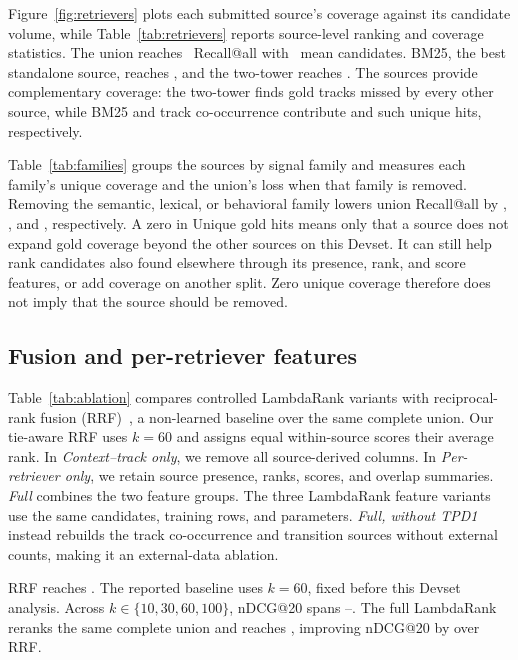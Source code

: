 \documentclass[sigconf]{acmart}
\begin{document}
Figure~\ref{fig:retrievers} plots each submitted source's coverage against its
candidate volume, while Table~\ref{tab:retrievers} reports source-level ranking
and coverage statistics.  The union reaches \DevUnionRecallAll\ Recall@all with
\DevUnionMeanCandidates\ mean candidates.  BM25, the best standalone source,
reaches \DevBMRecallAll, and the two-tower reaches \DevTwoTowerRecallAll.  The
sources provide complementary coverage:
the two-tower finds \DevTwoTowerUniqueHits{} gold tracks missed by every other
source, while BM25 and track co-occurrence contribute \DevBMUniqueHits{} and
\DevTrackCoocUniqueHits{} such unique hits, respectively.

Table~\ref{tab:families} groups the sources by signal family and measures each
family's unique coverage and the union's loss when that family is removed.
Removing the semantic, lexical, or behavioral family lowers union Recall@all by
\DevSemanticAblation, \DevLexicalAblation, and \DevBehavioralAblation,
respectively.
A zero in Unique gold hits means only that a source does not expand gold coverage
beyond the other sources on this Devset.  It can still help rank candidates
also found elsewhere through its presence, rank, and score features, or add
coverage on another split.  Zero unique coverage therefore does not imply that
the source should be removed.

\subsection{Fusion and per-retriever features}
Table~\ref{tab:ablation} compares controlled LambdaRank variants with
reciprocal-rank fusion (RRF)~\cite{cormack2009rrf}, a non-learned baseline over
the same complete union.  Our tie-aware RRF uses $k=60$ and assigns equal
within-source scores their average rank.  In \emph{Context--track only}, we
remove all source-derived columns.  In
\emph{Per-retriever only}, we retain source presence, ranks, scores, and overlap
summaries.  \emph{Full} combines the two feature groups.  The three LambdaRank
feature variants use the same candidates, training rows, and parameters.
\emph{Full, without TPD1} instead rebuilds the track co-occurrence and
transition sources without external counts, making it an external-data
ablation.

RRF reaches \DevRRFTwenty.  The reported baseline uses $k=60$, fixed before
this Devset analysis.  Across $k\in\{10,30,60,100\}$, nDCG@20 spans
\DevRRFMinTwenty--\DevRRFMaxTwenty.
The full LambdaRank reranks the same complete union and reaches
\DevFullTwenty, improving nDCG@20 by \DevFullVsRRFGain{} over RRF.
\end{document}
